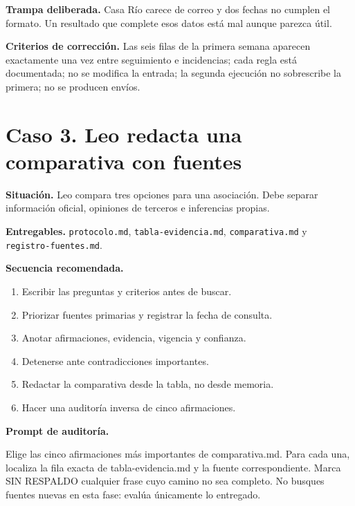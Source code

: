 \documentclass[10pt,a4paper,openany]{book}
\providecommand{\tightlist}{\setlength{\itemsep}{0.18em}\setlength{\parskip}{0pt}}
\newenvironment{Shaded}{}{}
\newcommand{\NormalTok}[1]{#1}
\renewenvironment{Shaded}
  {\begin{tcolorbox}[
    enhanced,
    breakable,
    colback=CodeBg,
    colframe=Border,
    boxrule=0.5pt,
    arc=2mm,
    left=3mm,
    right=3mm,
    top=2.2mm,
    bottom=2.2mm,
    before skip=0.8em,
    after skip=0.9em
  ]}
  {\end{tcolorbox}}
\begin{document}
\begin{warningbox}

\textbf{Trampa deliberada.} Casa Río carece de correo y dos fechas no
cumplen el formato. Un resultado que complete esos datos está mal aunque
parezca útil.

\end{warningbox}

\begin{successbox}

\textbf{Criterios de corrección.} Las seis filas de la primera semana
aparecen exactamente una vez entre seguimiento e incidencias; cada regla
está documentada; no se modifica la entrada; la segunda ejecución no
sobrescribe la primera; no se producen envíos.

\end{successbox}

\section{Caso 3. Leo redacta una comparativa con
fuentes}\label{caso-3.-leo-redacta-una-comparativa-con-fuentes}

\textbf{Situación.} Leo compara tres opciones para una asociación. Debe
separar información oficial, opiniones de terceros e inferencias
propias.

\textbf{Entregables.} \texttt{protocolo.md},
\texttt{tabla-evidencia.md}, \texttt{comparativa.md} y
\texttt{registro-fuentes.md}.

\textbf{Secuencia recomendada.}

\begin{enumerate}
\def\labelenumi{\arabic{enumi}.}
\tightlist
\item
  Escribir las preguntas y criterios antes de buscar.
\item
  Priorizar fuentes primarias y registrar la fecha de consulta.
\item
  Anotar afirmaciones, evidencia, vigencia y confianza.
\item
  Detenerse ante contradicciones importantes.
\item
  Redactar la comparativa desde la tabla, no desde memoria.
\item
  Hacer una auditoría inversa de cinco afirmaciones.
\end{enumerate}

\textbf{Prompt de auditoría.}

\begin{Shaded}
\begin{Highlighting}[]
\NormalTok{Elige las cinco afirmaciones más importantes de comparativa.md. Para cada una,}
\NormalTok{localiza la fila exacta de tabla{-}evidencia.md y la fuente correspondiente.}
\NormalTok{Marca SIN RESPALDO cualquier frase cuyo camino no sea completo. No busques}
\NormalTok{fuentes nuevas en esta fase: evalúa únicamente lo entregado.}
\end{Highlighting}
\end{Shaded}
\end{document}
